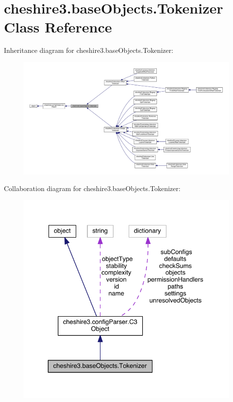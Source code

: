 \hypertarget{classcheshire3_1_1base_objects_1_1_tokenizer}{\section{cheshire3.\-base\-Objects.\-Tokenizer Class Reference}
\label{classcheshire3_1_1base_objects_1_1_tokenizer}
}


Inheritance diagram for cheshire3.\-base\-Objects.\-Tokenizer\-:
\nopagebreak
\begin{figure}[H]
\begin{center}
\leavevmode
\includegraphics[width=350pt]{classcheshire3_1_1base_objects_1_1_tokenizer__inherit__graph}
\end{center}
\end{figure}


Collaboration diagram for cheshire3.\-base\-Objects.\-Tokenizer\-:
\nopagebreak
\begin{figure}[H]
\begin{center}
\leavevmode
\includegraphics[width=326pt]{classcheshire3_1_1base_objects_1_1_tokenizer__coll__graph}
\end{center}
\end{figure}
